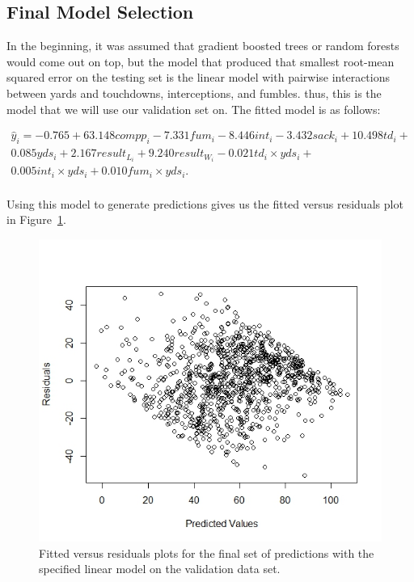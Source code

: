 \documentclass[12pt]{article}\usepackage[]{graphicx}\usepackage[]{color}
\begin{document}
\subsection{Final Model Selection}
In the beginning, it was assumed that gradient boosted trees or random forests would come out on top, but the model that produced that smallest root-mean squared error on the testing set is the linear model with pairwise interactions between yards and touchdowns, interceptions, and fumbles. thus, this is the model that we will use our validation set on. The fitted model is as follows:

\begin{multline*}
\hat{y}_{i}=-0.765+63.148compp_{i}-7.331fum_{i}-8.446int_{i}-3.432sack_{i}+10.498td_{i}+\\
0.085yds_{i}+2.167result_{L}_{i}+9.240result_{W}_{i}-0.021td_{i}\times yds_{i}+\\
0.005int_{i}\times yds_{i}+0.010fum_{i}\times yds_{i}.\\
\end{multline*}

Using this model to generate predictions gives us the fitted versus residuals plot in Figure~\ref{fig:finally}.

\begin{figure}[h]
	\centering
	\includegraphics[width=\textwidth]{finally.jpeg}
	\captionsetup{font=footnotesize,labelfont=footnotesize}
	\caption{\label{fig:finally} Fitted versus residuals plots for the final set of predictions with the specified linear model on the validation data set.}
\end{figure}
\end{document}

